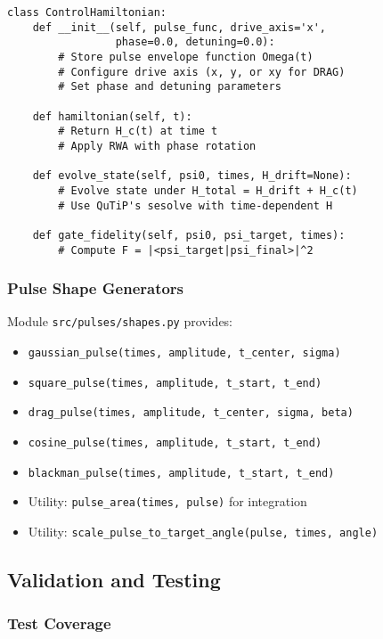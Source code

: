 \documentclass[11pt,a4paper]{article}
\theoremstyle{definition}
\theoremstyle{remark}
\begin{document}
\begin{lstlisting}[caption={ControlHamiltonian class structure}]
class ControlHamiltonian:
    def __init__(self, pulse_func, drive_axis='x',
                 phase=0.0, detuning=0.0):
        # Store pulse envelope function Omega(t)
        # Configure drive axis (x, y, or xy for DRAG)
        # Set phase and detuning parameters

    def hamiltonian(self, t):
        # Return H_c(t) at time t
        # Apply RWA with phase rotation

    def evolve_state(self, psi0, times, H_drift=None):
        # Evolve state under H_total = H_drift + H_c(t)
        # Use QuTiP's sesolve with time-dependent H

    def gate_fidelity(self, psi0, psi_target, times):
        # Compute F = |<psi_target|psi_final>|^2
\end{lstlisting}

\subsubsection{Pulse Shape Generators}

Module \texttt{src/pulses/shapes.py} provides:
\begin{itemize}
    \item \texttt{gaussian\_pulse(times, amplitude, t\_center, sigma)}
    \item \texttt{square\_pulse(times, amplitude, t\_start, t\_end)}
    \item \texttt{drag\_pulse(times, amplitude, t\_center, sigma, beta)}
    \item \texttt{cosine\_pulse(times, amplitude, t\_start, t\_end)}
    \item \texttt{blackman\_pulse(times, amplitude, t\_start, t\_end)}
    \item Utility: \texttt{pulse\_area(times, pulse)} for integration
    \item Utility: \texttt{scale\_pulse\_to\_target\_angle(pulse, times, angle)}
\end{itemize}

\subsection{Validation and Testing}

\subsubsection{Test Coverage}
\end{document}
